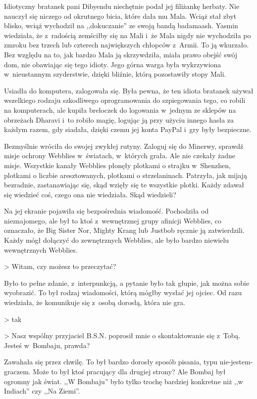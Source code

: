 \documentclass[oneside,polish,11pt,rmheadings]{mwbk}
\begin{document}
Idiotyczny bratanek pani Dibyendu niechętnie podał jej filiżankę herbaty. Nie nauczył się niczego od okrutnego bicia, które dała mu Mala. Wciąż stał zbyt blisko, wciąż wychodził na ,,dokuczanie'' ze swoją bandą badamaash. Yasmin wiedziała, że z~radością zemściłby się na Mali i~że Mala nigdy nie wychodziła po zmroku bez trzech lub czterech największych chłopców z~Armii. To ją wkurzało. Bez względu na to, jak bardzo Mala ją skrzywdziła, miała prawo obejść swój dom, nie obawiając się tego idioty. Jego górna warga była wykrzywiona w~nieustannym szyderstwie, dzięki bliźnie, którą pozostawiły stopy Mali.

Usiadła do komputera, zalogowała się. Była pewna, że ten idiota bratanek używał wszelkiego rodzaju szkodliwego oprogramowania do szpiegowania tego, co robili na komputerach, ale kupiła breloczek do logowania w~jednym ze sklepów na obrzeżach Dharavi i~to robiło magię, logując ją przy użyciu innego hasła za każdym razem, gdy siadała, dzięki czemu jej konta PayPal i~gry były bezpieczne.

Bezmyślnie wróciła do swojej zwykłej rutyny. Zaloguj się do Minerwy, sprawdź misje ochrony Webblies w~światach, w~których grała. Ale nie czekały żadne misje. Wszystkie kanały Webblies płonęły plotkami o strajku w~Shenzhen, plotkami o liczbie aresztowanych, plotkami o strzelaninach. Patrzyła, jak mijają bezradnie, zastanawiając się, skąd wzięły się te wszystkie plotki. Każdy zdawał się wiedzieć coś, czego ona nie wiedziała. Skąd wiedzieli?

Na jej ekranie pojawiła się bezpośrednia wiadomość. Pochodziła od nieznajomego, ale był to ktoś z~wewnętrznej grupy afinicji Webblies, co oznaczało, że Big Sister Nor, Mighty Krang lub Justbob ręcznie ją zatwierdzili. Każdy mógł dołączyć do zewnętrznych Webblies, ale było bardzo niewielu wewnętrznych Webblies.

{\textgreater} Witam, czy możesz to przeczytać?

Było to pełne zdanie, z~interpunkcją, a pytanie było tak głupie, jak można sobie wyobrazić. To był rodzaj wiadomości, którą mógłby wysłać jej ojciec. Od razu wiedziała, że komunikuje się z~osobą dorosłą, która nie gra.

{\textgreater} tak

{\textgreater} Nasz wspólny przyjaciel B.S.N. poprosił mnie o skontaktowanie się z~Tobą. Jesteś w~Bombaju, prawda?

Zawahała się przez chwilę. To był bardzo dorosły sposób pisania, typu nie-jestem-graczem. Może to był ktoś pracujący dla drugiej strony? Ale Bombaj był ogromny jak świat. ,,W Bombaju'' było tylko trochę bardziej konkretne niż ,,w Indiach'' czy ,,Na Ziemi''.
\end{document}
